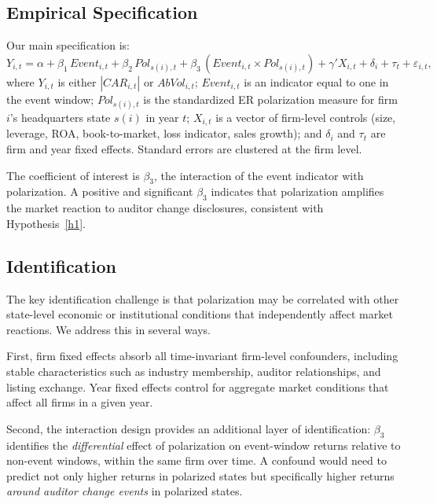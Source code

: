 \subsection{Empirical Specification}

Our main specification is:
\begin{equation}
    \label{eq:main}
    Y_{i,t} = \alpha + \beta_1\,\textit{Event}_{i,t}
    + \beta_2\,\textit{Pol}_{s(i),t}
    + \beta_3\,(\textit{Event}_{i,t} \times \textit{Pol}_{s(i),t})
    + \gamma' X_{i,t} + \delta_i + \tau_t + \varepsilon_{i,t},
\end{equation}
where $Y_{i,t}$ is either $|CAR_{i,t}|$ or $AbVol_{i,t}$;
$\textit{Event}_{i,t}$ is an indicator equal to one in the event window;
$\textit{Pol}_{s(i),t}$ is the standardized ER polarization measure for firm
$i$'s headquarters state $s(i)$ in year $t$; $X_{i,t}$ is a vector of
firm-level controls (size, leverage, ROA, book-to-market, loss indicator,
sales growth); and $\delta_i$ and $\tau_t$ are firm and year fixed effects.
Standard errors are clustered at the firm level.

The coefficient of interest is $\beta_3$, the interaction of the event
indicator with polarization. A positive and significant $\beta_3$ indicates
that polarization amplifies the market reaction to auditor change disclosures,
consistent with Hypothesis~\ref{h1}.

\subsection{Identification}

The key identification challenge is that polarization may be correlated with
other state-level economic or institutional conditions that independently
affect market reactions. We address this in several ways.

First, firm fixed effects absorb all time-invariant firm-level confounders,
including stable characteristics such as industry membership, auditor
relationships, and listing exchange. Year fixed effects control for aggregate
market conditions that affect all firms in a given year.

Second, the interaction design provides an additional layer of identification:
$\beta_3$ identifies the \textit{differential} effect of polarization on
event-window returns relative to non-event windows, within the same firm
over time. A confound would need to predict not only higher returns in
polarized states but specifically higher returns \textit{around auditor change
events} in polarized states.


